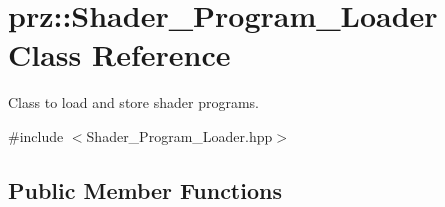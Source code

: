 \hypertarget{classprz_1_1_shader___program___loader}{}\section{prz\+::Shader\+\_\+\+Program\+\_\+\+Loader Class Reference}
\label{classprz_1_1_shader___program___loader}


Class to load and store shader programs.  




{\ttfamily \#include $<$Shader\+\_\+\+Program\+\_\+\+Loader.\+hpp$>$}

\subsection*{Public Member Functions}
